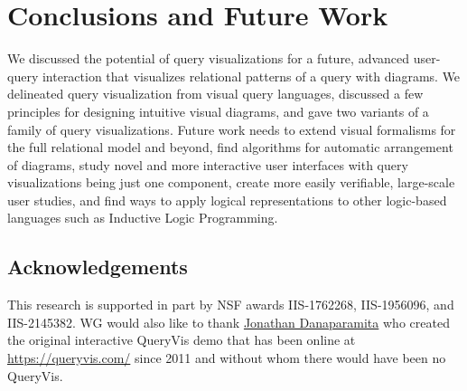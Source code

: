 \documentclass[letterpaper,11pt]{article}
\newcommand{\queryvis}{\textsf{QueryVis}\xspace}
\begin{document}













\section{Conclusions and Future Work} 
\label{sec:conclusions_and_future_work}

We discussed the potential of query visualizations for a future, advanced user-query interaction
that visualizes relational patterns of a query with diagrams.
We delineated query visualization from visual query languages,
discussed a few principles for designing intuitive visual diagrams,
and gave two variants of a family of query visualizations.
Future work needs to  extend visual formalisms for the full relational model and beyond,
find algorithms for automatic arrangement of diagrams,
study novel and more interactive user interfaces 
with query visualizations being just one component, 
create more easily verifiable, large-scale user studies,
and find ways to apply logical representations to other logic-based languages such as Inductive Logic Programming.





\subsection*{Acknowledgements} 

This research is supported in part by NSF awards IIS-1762268, IIS-1956096, and IIS-2145382.
WG would also like to thank \href{https://www.linkedin.com/in/danaparamita/}{Jonathan Danaparamita} 
who created the original interactive QueryVis demo that has been online at 
\url{https://queryvis.com/} since 2011 and
without whom there would have been no \queryvis. 








%
\end{document}
